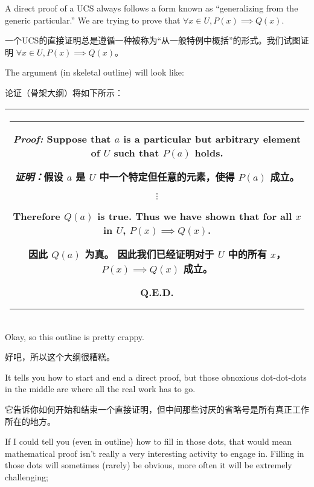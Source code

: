 A direct proof of a UCS
always follows a form known as 
``generalizing from the generic particular.''
We are trying to prove that $\forall x \in U, P(x) \implies Q(x)$.

一个UCS的直接证明总是遵循一种被称为“从一般特例中概括”的形式。我们试图证明 $\forall x \in U, P(x) \implies Q(x)$。

The argument (in skeletal outline) will look like:
\medskip

论证（骨架大纲）将如下所示：
\medskip

\begin{center}
\begin{tabular}{|c|} \hline
\rule{16pt}{0pt}\begin{minipage}{.75\textwidth}
\rule{0pt}{20pt} {\em Proof:} Suppose that $a$ is a particular but arbitrary element of $U$ such 
that $P(a)$ holds.

{\em 证明：}假设 $a$ 是 $U$ 中一个特定但任意的元素，使得 $P(a)$ 成立。
\begin{center}
$\vdots$
\end{center}

Therefore $Q(a)$ is true. \newline
Thus we have shown that for all $x$ in $U$, $P(x) \implies Q(x)$.\newline

因此 $Q(a)$ 为真。\newline
因此我们已经证明对于 $U$ 中的所有 $x$，$P(x) \implies Q(x)$ 成立。\newline
\rule{0pt}{0pt} \hspace{\fill} Q.E.D.
\rule[-10pt]{0pt}{16pt}
\end{minipage} \rule{16pt}{0pt} \\ \hline
\end{tabular}
\end{center}
\medskip

Okay, so this outline is pretty crappy.

好吧，所以这个大纲很糟糕。

It tells you how to start and 
end a direct proof, but those obnoxious dot-dot-dots in the middle are 
where all the real work has to go.

它告诉你如何开始和结束一个直接证明，但中间那些讨厌的省略号是所有真正工作所在的地方。

If I could tell you (even in outline) 
how to fill in those dots, that would mean mathematical proof isn't really 
a very interesting activity to engage in.  Filling in those dots will 
sometimes (rarely) be obvious, more often it will be extremely challenging;

